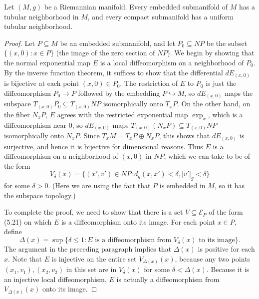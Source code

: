 \begin{theorem}
\label{thm:tubular-neighborhood}

Let $(M, g)$ be a Riemannian manifold. Every embedded submanifold of $M$ has a tubular neighborhood in $M$, and every compact submanifold has a uniform tubular neighborhood.


\begin{proof}
Let $P \subseteq M$ be an embedded submanifold, and let $P_0 \subseteq NP$ be the subset $\{(x,0) : x \in P\}$ (the image of the zero section of $NP$). We begin by showing that the normal exponential map $E$ is a local diffeomorphism on a neighborhood of $P_0$. By the inverse function theorem, it suffices to show that the differential $dE_{(x,0)}$ is bijective at each point $(x,0) \in P_0$. The restriction of $E$ to $P_0$ is just the diffeomorphism $P_0 \to P$ followed by the embedding $P \hookrightarrow M$, so $dE_{(x,0)}$ maps the subspace $T_{(x,0)}P_0 \subseteq T_{(x,0)}NP$ isomorphically onto $T_x P$. On the other hand, on the fiber $N_x P$, $E$ agrees with the restricted exponential map $\exp_x$, which is a diffeomorphism near $0$, so $dE_{(x,0)}$ maps $T_{(x,0)}(N_x P) \subseteq T_{(x,0)}NP$ isomorphically onto $N_x P$. Since $T_x M = T_x P \oplus N_x P$, this shows that $dE_{(x,0)}$ is surjective, and hence it is bijective for dimensional reasons. Thus $E$ is a diffeomorphism on a neighborhood of $(x,0)$ in $NP$, which we can take to be of the form
\begin{equation}
V_\delta(x) = \{(x', v') \in NP : d_g(x,x') < \delta, |v'|_g < \delta\} \tag{5.22}
\end{equation}
for some $\delta > 0$. (Here we are using the fact that $P$ is embedded in $M$, so it has the subspace topology.)

To complete the proof, we need to show that there is a set $V \subseteq \mathcal{E}_P$ of the form (5.21) on which $E$ is a diffeomorphism onto its image. For each point $x \in P$, define
\begin{equation}
\Delta(x) = \sup\{\delta \leq 1 : E \text{ is a diffeomorphism from } V_\delta(x) \text{ to its image}\}. \tag{5.23}
\end{equation}
The argument in the preceding paragraph implies that $\Delta(x)$ is positive for each $x$. Note that $E$ is injective on the entire set $V_{\Delta(x)}(x)$, because any two points $(x_1, v_1), (x_2, v_2)$ in this set are in $V_\delta(x)$ for some $\delta < \Delta(x)$. Because it is an injective local diffeomorphism, $E$ is actually a diffeomorphism from $V_{\Delta(x)}(x)$ onto its image.


\end{proof}
\end{theorem}
